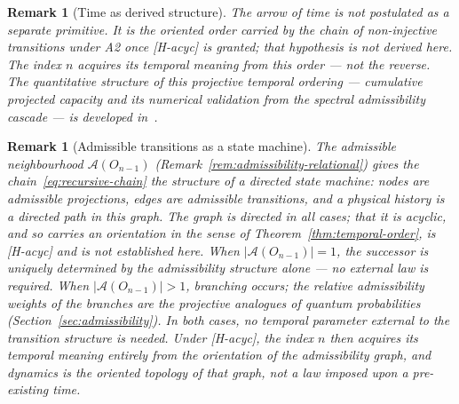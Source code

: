 \documentclass[11pt,a4paper]{article}
\newtheorem{remark}[theorem]{Remark}
\begin{document}
    \begin{remark}[Time as derived structure]
  The arrow of time is not postulated as a separate primitive.
  It is the oriented order carried by the chain of non-injective transitions under A2 once
  \textup{[H-acyc]} is granted; that hypothesis is not derived here.
  The index $n$ acquires its temporal meaning from this order — not the reverse.
  The quantitative structure of this projective temporal ordering — cumulative
  projected capacity and its numerical validation from the spectral admissibility
  cascade — is developed in~\cite{Beau2026pto}.
    \end{remark}

    \begin{remark}[Admissible transitions as a state machine]
      \label{rem:state-machine}
      The admissible neighbourhood $\mathcal{A}(O_{n-1})$
      (Remark~\ref{rem:admissibility-relational}) gives the
      chain~\eqref{eq:recursive-chain} the structure of a directed state machine:
      nodes are admissible projections, edges are admissible transitions, and a
      physical history is a directed path in this graph.
      The graph is directed in all cases; that it is acyclic, and so carries an orientation in
      the sense of Theorem~\ref{thm:temporal-order}, is \textup{[H-acyc]} and is not
      established here.
      When $|\mathcal{A}(O_{n-1})| = 1$, the successor is uniquely determined by the
      admissibility structure alone — no external law is required.
      When $|\mathcal{A}(O_{n-1})| > 1$, branching occurs; the relative admissibility
      weights of the branches are the projective analogues of quantum probabilities
      (Section~\ref{sec:admissibility}).
      In both cases, no temporal parameter external to the transition structure is needed.
      Under \textup{[H-acyc]}, the index $n$ then acquires its temporal meaning entirely from the
      orientation of the admissibility graph, and \emph{dynamics is the oriented topology of that
      graph, not a law imposed upon a pre-existing time}.
    \end{remark}
\end{document}
